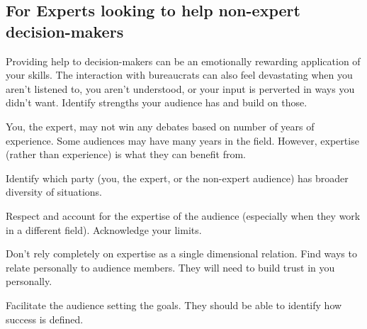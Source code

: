 \subsection*{For Experts looking to help non-expert decision-makers}

Providing help to decision-makers can be an emotionally rewarding application of your skills. The interaction with bureaucrats can also feel devastating when you aren't listened to, you aren't understood, or your input is perverted in ways you didn't want. %
Identify strengths your audience has and build on those.








You, the expert, may not win any debates based on number of years of experience. Some audiences may have many years in the field. However, expertise (rather than experience) is what they can benefit from. 

Identify which party (you, the expert, or the non-expert audience) has broader diversity of situations.

Respect and account for the expertise of the audience (especially when they work in a different field). Acknowledge your  limits.

Don't rely completely on expertise as a single dimensional relation. Find ways to relate personally to audience members. They will need to build trust in you personally.

Facilitate the audience setting the goals. They should be able to identify how success is defined.


